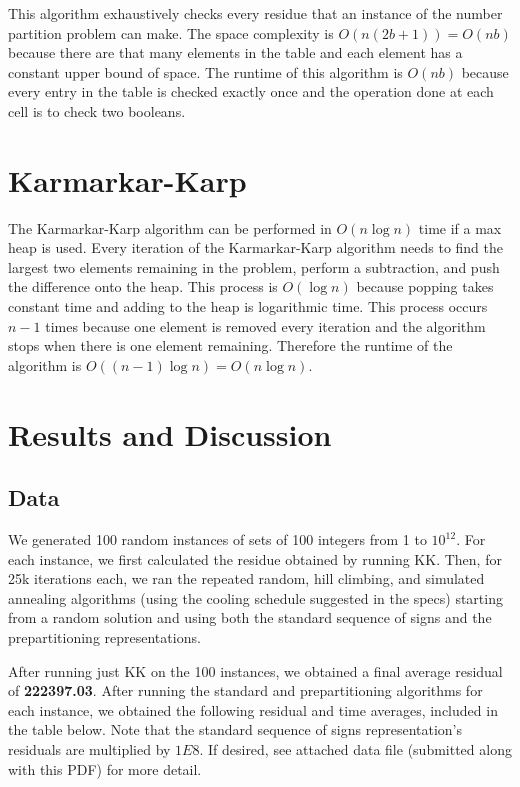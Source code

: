 \documentclass[a4paper]{article}
\begin{document}
	This algorithm exhaustively checks every residue that an instance of the number partition problem can make. The space complexity is $O(n(2b+1)) = O(nb)$ because there are that many elements in the table and each element has a constant upper bound of space. The runtime of this algorithm is $O(nb)$ because every entry in the table is checked exactly once and the operation done at each cell is to check two booleans.
	
	\section{Karmarkar-Karp}
	The Karmarkar-Karp algorithm can be performed in $O(n\log n)$ time if a max heap is used. Every iteration of the Karmarkar-Karp algorithm needs to find the largest two elements remaining in the problem, perform a subtraction, and push the difference onto the heap. This process is $O(\log n)$ because popping takes constant time and adding to the heap is logarithmic time. This process occurs $n-1$ times because one element is removed every iteration and the algorithm stops when there is one element remaining. Therefore the runtime of the algorithm is $O((n-1) \log n) = O(n\log n)$.
	
	\section{Results and Discussion}
	\subsection{Data}
	We generated 100 random instances of sets of 100 integers from 1 to $10^{12}$. For each instance, we first calculated the residue obtained by running KK. Then, for 25k iterations each, we ran the repeated random, hill climbing, and simulated annealing algorithms (using the cooling schedule suggested in the specs) starting from a random solution and using both the standard sequence of signs and the prepartitioning representations. 
	
	After running just KK on the 100 instances, we obtained a final average residual of \textbf{222397.03}. After running the standard and prepartitioning algorithms for each instance, we obtained the following residual and time averages, included in the table below. Note that the standard sequence of signs representation's residuals are multiplied by $1E8$. If desired, see attached data file (submitted along with this PDF) for more detail. 
	
\end{document}
